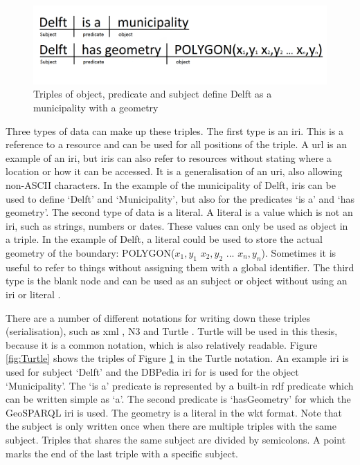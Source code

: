 \begin{figure}
	\includegraphics[width=0.7\linewidth]{figs/Triples.png}
	\caption{Triples of object, predicate and subject define Delft as a municipality with a geometry}
	\label{fig:Triples}
\end{figure}

Three types of data can make up these triples. The first type is an \ac{iri}. This is a reference to a resource and can be used for all positions of the triple. A \ac{url} is an example of an \ac{iri}, but \ac{iri}s can also refer to resources without stating where a location or how it can be accessed. It is a generalisation of an \ac{uri}, also allowing non-ASCII characters. In the example of the municipality of Delft, \ac{iri}s can be used to define `Delft' and `Municipality', but also for the predicates `is a' and `has geometry'. The second type of data is a literal. A literal is a value which is not an \ac{iri}, such as strings, numbers or dates. These values can only be used as object in a triple. In the example of Delft, a literal could be used to store the actual geometry of the boundary: POLYGON($x_{1},y_{1}$ $x_{2},y_{2}$ ... $x_{n},y_{n}$). Sometimes it is useful to refer to things without assigning them with a global identifier. The third type is the blank node and can be used as an subject or object without using an \ac{iri} or literal \citep{LD:W3C6}.  

There are a number of different notations for writing down these triples (serialisation), such as \ac{xml} \citep{LD:W3C3}, N3 \citep{LD:W3C5} and Turtle \citep{LD:W3C4}. Turtle will be used in this thesis, because it is a common notation, which is also relatively readable. Figure \ref{fig:Turtle} shows the triples of Figure \ref{fig:Triples} in the Turtle notation. An example \ac{iri} is used for subject `Delft' and the DBPedia \ac{iri} for is used for the object `Municipality'. The `is a' predicate is represented by a built-in \ac{rdf} predicate which can be written simple as `a'. The second predicate is `hasGeometry' for which the GeoSPARQL \ac{iri} is used. The geometry is a literal in the \ac{wkt} format. Note that the subject is only written once when there are multiple triples with the same subject. Triples that shares the same subject are divided by semicolons. A point marks the end of the last triple with a specific subject.

